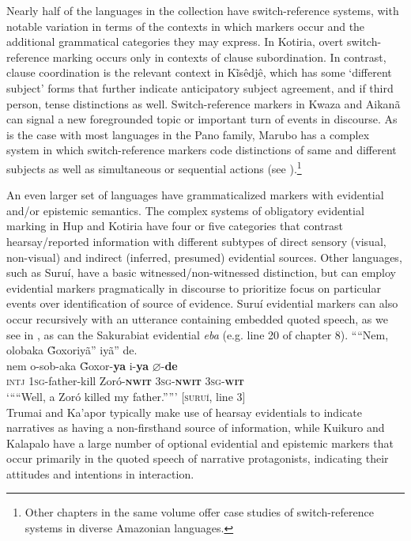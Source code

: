 \documentclass[output=paper,
modfonts,nonflat
]{langsci/langscibook}
\begin{document}
 Nearly half of the languages in the collection have switch-reference systems, with notable variation in terms of the contexts in which markers occur and the additional grammatical categories they may express. In Kotiria, overt switch-reference marking occurs only in contexts of clause subordination. In contrast, clause coordination is the relevant context in Kĩsêdjê, which has some ‘different subject’ forms that further indicate anticipatory subject agreement, and if third person, tense distinctions as well. Switch-reference markers in Kwaza and Aikanã can signal a new foregrounded topic or important turn of events in discourse. As is the case with most languages in the Pano family, Marubo has a complex system in which switch-reference markers code distinctions of same and different subjects as well as simultaneous or sequential actions (see \citealt{vanGijn2016}).\footnote{Other chapters in the same volume offer case studies of switch-reference systems in diverse Amazonian languages.} 
     
An even larger set of languages have grammaticalized markers with evidential and/or epistemic semantics. The complex systems of obligatory evidential marking in Hup and Kotiria have four or five categories that contrast hearsay/reported information with different subtypes of direct sensory (visual, non-visual) and indirect (inferred, presumed) evidential sources. Other languages, such as Suruí, have a basic witnessed/non-witnessed distinction, but can employ evidential markers pragmatically in discourse to prioritize focus on particular events over identification of source of evidence. Suruí evidential markers can also occur recursively with an utterance containing embedded quoted speech, as we see in , as can the Sakurabiat evidential \textit{eba} (e.g. line 20 of chapter 8). 
\ea\label{ex:intro:32} ““Nem, olobaka \~{G}oxoriyã” iyã” de.\\[.3em]
\gll nem o-sob-aka \~{G}oxor-\textbf{ya} i-\textbf{ya} \(\varnothing\)-\textbf{de}\\
\textsc{intj} \textsc{1sg}-father-kill Zoró-\textbf{\textsc{nwit}} \textsc{3sg-\textbf{nwit}} \textsc{3sg-\textbf{wit}}\\
\glt ‘““Well, a Zoró killed my father.””’ [\textsc{suruí}, line 3]\\
\z 
Trumai and Ka’apor typically make use of hearsay evidentials to indicate narratives as having a non-firsthand source of information, while Kuikuro and Kalapalo have a large number of optional evidential and epistemic markers that occur primarily in the quoted speech of narrative protagonists, indicating their attitudes and intentions in interaction. 
\end{document}
